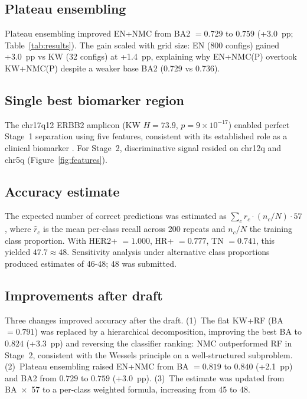 \documentclass[11pt,a4paper,twocolumn]{article}
\begin{document}
\subsection{Plateau ensembling}
\label{sec:plateau}

Plateau ensembling improved EN+NMC from BA2 $= 0.729$ to $0.759$ (+3.0~pp; Table~\ref{tab:results}). The gain scaled with grid size: EN (800 configs) gained +3.0~pp vs KW (32 configs) at +1.4~pp, explaining why EN+NMC(P) overtook KW+NMC(P) despite a weaker base BA2 (0.729 vs 0.736).

\subsection{Single best biomarker region}
\label{sec:biomarker}

The chr17q12 ERBB2 amplicon (KW $H = 73.9$, $p = 9 \times 10^{-17}$) enabled perfect Stage~1 separation using five features, consistent with its established role as a clinical biomarker \citep{slamon1987her2}. For Stage~2, discriminative signal resided on chr12q and chr5q (Figure~\ref{fig:features}).

\subsection{Accuracy estimate}
\label{sec:estimate}

The expected number of correct predictions was estimated as $\sum_c \hat{r}_c \cdot (n_c/N) \cdot 57$, where $\hat{r}_c$ is the mean per-class recall across 200 repeats and $n_c/N$ the training class proportion. With HER2+ $= 1.000$, HR+ $= 0.777$, TN $= 0.741$, this yielded $47.7 \approx 48$. Sensitivity analysis under alternative class proportions produced estimates of 46-48; 48 was submitted.

\subsection{Improvements after draft}
\label{sec:improvements}

Three changes improved accuracy after the draft. (1)~The flat KW+RF (BA $= 0.791$) was replaced by a hierarchical decomposition, improving the best BA to $0.824$ (+3.3~pp) and reversing the classifier ranking: NMC outperformed RF in Stage~2, consistent with the Wessels principle on a well-structured subproblem. (2)~Plateau ensembling raised EN+NMC from BA $= 0.819$ to $0.840$ (+2.1~pp) and BA2 from $0.729$ to $0.759$ (+3.0~pp). (3)~The estimate was updated from BA~$\times$~57 to a per-class weighted formula, increasing from 45 to 48.
\end{document}

